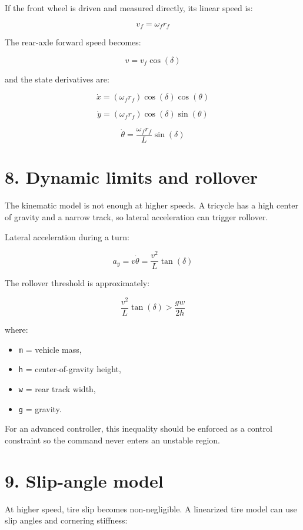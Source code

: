 \documentclass[12pt,a4paper,oneside]{report}
\providecommand{\tightlist}{\setlength{\itemsep}{0pt}\setlength{\parskip}{0pt}}
\begin{document}
If the front wheel is driven and measured directly, its linear speed is:

\[
v_f = \omega_f r_f
\]

The rear-axle forward speed becomes:

\[
v = v_f \cos(\delta)
\]

and the state derivatives are:

\[
\dot{x} = (\omega_f r_f)\cos(\delta)\cos(\theta)
\]

\[
\dot{y} = (\omega_f r_f)\cos(\delta)\sin(\theta)
\]

\[
\dot{\theta} = \frac{\omega_f r_f}{L}\sin(\delta)
\]

\section{8. Dynamic limits and rollover}\label{dynamic-limits-and-rollover}

The kinematic model is not enough at higher speeds. A tricycle has a high center
of gravity and a narrow track, so lateral acceleration can trigger rollover.

Lateral acceleration during a turn:

\[
a_y = v\dot{\theta} = \frac{v^2}{L}\tan(\delta)
\]

The rollover threshold is approximately:

\[
\frac{v^2}{L}\tan(\delta) > \frac{g w}{2h}
\]

where:

\begin{itemize}
\tightlist
\item
  \texttt{m} = vehicle mass,
\item
  \texttt{h} = center-of-gravity height,
\item
  \texttt{w} = rear track width,
\item
  \texttt{g} = gravity.
\end{itemize}

For an advanced controller, this inequality should be enforced as a control
constraint so the command never enters an unstable region.

\section{9. Slip-angle model}\label{slip-angle-model}

At higher speed, tire slip becomes non-negligible. A linearized tire model can
use slip angles and cornering stiffness:
\end{document}
